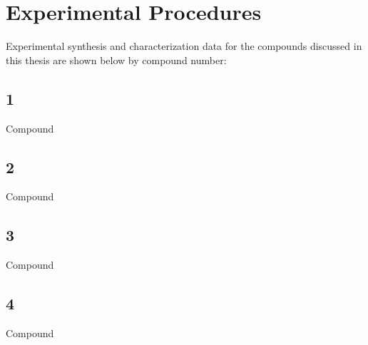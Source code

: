 \chapter{Experimental Procedures} \label{chap.exp}

Experimental synthesis and characterization data for the compounds discussed in this thesis are shown below by compound number:

\section{1} \label{sec:c1}
Compound 

\section{2} \label{sec:c2}
Compound

\section{3} \label{sec:c3}
Compound

\section{4} \label{sec:c4}
Compound